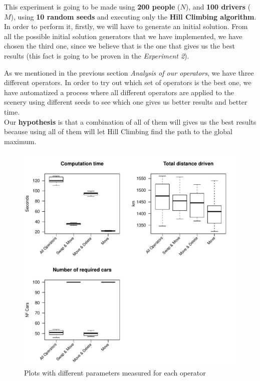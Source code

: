 \documentclass[12]{article}
\begin{document}
This experiment is going to be made using \textbf{200 people }($N$), and \textbf{100 drivers }($M$), using \textbf{10 random seeds} and executing only the \textbf{Hill Climbing algorithm}. In order to perform it, firstly, we will have to generate an initial solution. From all the possible initial solution generators that we have implemented, we have chosen the third one, since we believe that is the one that gives us the best results (this fact is going to be proven in the \textit{Experiment 2}). 

As we mentioned in the previous section \textit{Analysis of our operators}, we have three different operators. In order to try out which set of operators is the best one, we have automatized a process where all different operators are applied to the scenery using different seeds to see which one gives us better results and better time. 
\\
Our \textbf{hypothesis} is that a combination of all of them will gives us the best results because using all of them will let Hill Climbing find the path to the global maximum. 

\begin{figure}[H]
\centering
\includegraphics[width=\textwidth,height=\textheight, keepaspectratio]{Results/data_1.pdf}
\caption{Plots with different parameters measured for each operator }
\label{operators}
\end{figure}
\vspace{1cm}
\end{document}

